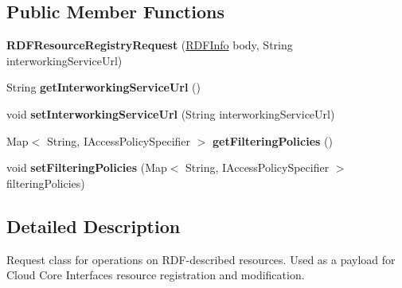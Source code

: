 \subsection*{Public Member Functions}
\begin{DoxyCompactItemize}
\item 
\mbox{\label{classeu_1_1h2020_1_1symbiote_1_1core_1_1cci_1_1RDFResourceRegistryRequest_a72734729153884ac2977ede054030950}} 
{\bfseries R\+D\+F\+Resource\+Registry\+Request} (\hyperlink{classeu_1_1h2020_1_1symbiote_1_1core_1_1internal_1_1RDFInfo}{R\+D\+F\+Info} body, String interworking\+Service\+Url)
\item 
\mbox{\label{classeu_1_1h2020_1_1symbiote_1_1core_1_1cci_1_1RDFResourceRegistryRequest_abb9c8a8ec87bf758c2707f5665a72b1a}} 
String {\bfseries get\+Interworking\+Service\+Url} ()
\item 
\mbox{\label{classeu_1_1h2020_1_1symbiote_1_1core_1_1cci_1_1RDFResourceRegistryRequest_a83b49ddab07402da73464766bc16f2f5}} 
void {\bfseries set\+Interworking\+Service\+Url} (String interworking\+Service\+Url)
\item 
\mbox{\label{classeu_1_1h2020_1_1symbiote_1_1core_1_1cci_1_1RDFResourceRegistryRequest_ade169ff120a26d1850aa94407b15156a}} 
Map$<$ String, I\+Access\+Policy\+Specifier $>$ {\bfseries get\+Filtering\+Policies} ()
\item 
\mbox{\label{classeu_1_1h2020_1_1symbiote_1_1core_1_1cci_1_1RDFResourceRegistryRequest_a3cb7262fc10c667196fe44f8d7137258}} 
void {\bfseries set\+Filtering\+Policies} (Map$<$ String, I\+Access\+Policy\+Specifier $>$ filtering\+Policies)
\end{DoxyCompactItemize}


\subsection{Detailed Description}
Request class for operations on R\+D\+F-\/described resources. Used as a payload for Cloud Core Interface\textquotesingle{}s resource registration and modification.


